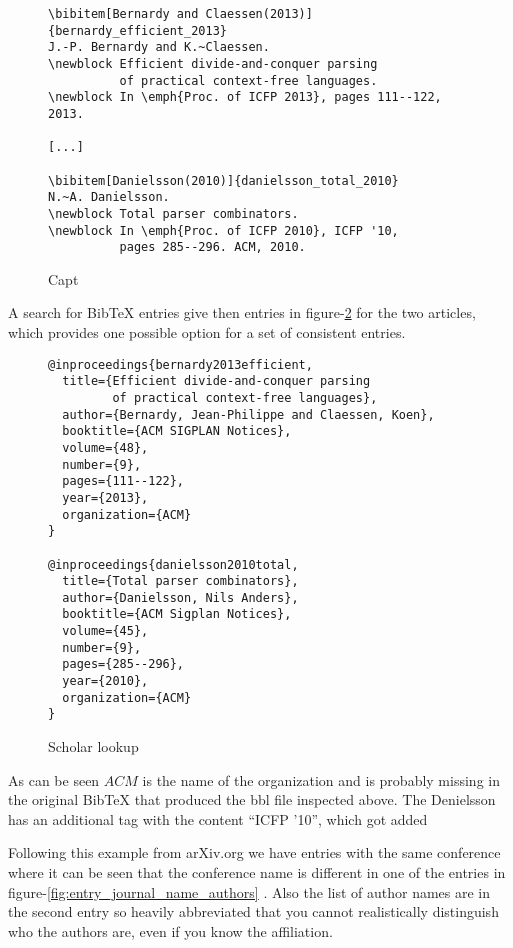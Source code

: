 
\begin{figure}[ht]
  \centering
  \begin{small}
\begin{verbatim}
\bibitem[Bernardy and Claessen(2013)]{bernardy_efficient_2013}
J.-P. Bernardy and K.~Claessen.
\newblock Efficient divide-and-conquer parsing 
          of practical context-free languages.
\newblock In \emph{Proc. of ICFP 2013}, pages 111--122, 2013.

[...]

\bibitem[Danielsson(2010)]{danielsson_total_2010}
N.~A. Danielsson.
\newblock Total parser combinators.
\newblock In \emph{Proc. of ICFP 2010}, ICFP '10,
          pages 285--296. ACM, 2010.
\end{verbatim}
  \end{small}
  \caption{Capt}
\label{fig:inconsistent_proceedings}
\end{figure}

A search for Bib{\TeX} entries give then entries in
figure-\ref{fig:missing_org_scholar_lookup} for the two articles, which
provides one possible option for a set of consistent entries.

\begin{figure}[ht]
  \centering
\begin{verbatim}
@inproceedings{bernardy2013efficient,
  title={Efficient divide-and-conquer parsing
         of practical context-free languages},
  author={Bernardy, Jean-Philippe and Claessen, Koen},
  booktitle={ACM SIGPLAN Notices},
  volume={48},
  number={9},
  pages={111--122},
  year={2013},
  organization={ACM}
}

@inproceedings{danielsson2010total,
  title={Total parser combinators},
  author={Danielsson, Nils Anders},
  booktitle={ACM Sigplan Notices},
  volume={45},
  number={9},
  pages={285--296},
  year={2010},
  organization={ACM}
}
\end{verbatim}
  \caption{Scholar lookup}
\label{fig:missing_org_scholar_lookup}
\end{figure}

As can be seen $ACM$ is the name of the organization and is probably
missing in the original Bib{\TeX} that produced the bbl file inspected
above.  The Denielsson has an additional tag with the content ``ICFP
'10'', which got added 


Following this example from arXiv.org we have entries with the same
conference where it can be seen that the conference name is different
in one of the entries in figure-\ref{fig:entry_journal_name_authors}
.  Also the list of author
names are in the second entry so heavily abbreviated that you cannot
realistically distinguish who the authors are, even if you know the
affiliation.

